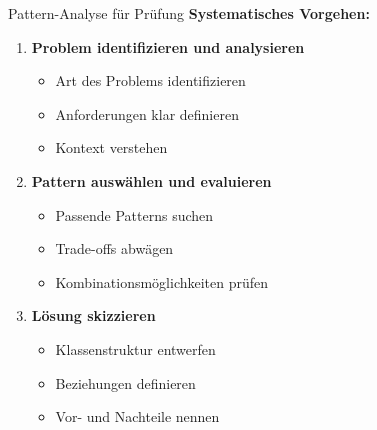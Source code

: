 \begin{KR}{Pattern-Analyse für Prüfung}
\textbf{Systematisches Vorgehen:}
\begin{enumerate}
    \item \textbf{Problem identifizieren und analysieren}
    \begin{itemize}
        \item Art des Problems identifizieren
        \item Anforderungen klar definieren
        \item Kontext verstehen
    \end{itemize}
    
    \item \textbf{Pattern auswählen und evaluieren}
    \begin{itemize}
        \item Passende Patterns suchen
        \item Trade-offs abwägen
        \item Kombinationsmöglichkeiten prüfen
    \end{itemize}
    
    \item \textbf{Lösung skizzieren}
    \begin{itemize}
        \item Klassenstruktur entwerfen
        \item Beziehungen definieren
        \item Vor- und Nachteile nennen
    \end{itemize}
\end{enumerate}
\end{KR}

